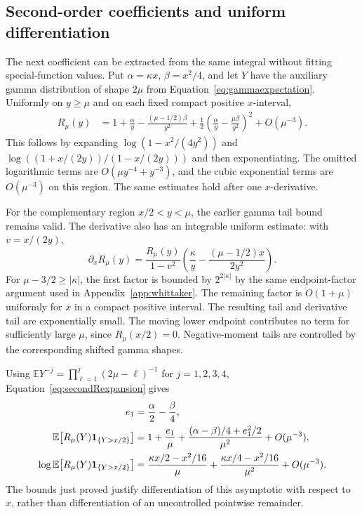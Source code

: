 \documentclass[11pt,letterpaper]{article}
\numberwithin{equation}{section}
\theoremstyle{definition}
\theoremstyle{remark}
\begin{document}
\subsection{Second-order coefficients and uniform differentiation}
\label{subsec:secondorderwhittaker}
The next coefficient can be extracted from the same integral without fitting special-function values. Put $\alpha=\kappa x$, $\beta=x^2/4$, and let $Y$ have the auxiliary gamma distribution of shape $2\mu$ from Equation~\eqref{eq:gammaexpectation}. Uniformly on $y\geq\mu$ and on each fixed compact positive $x$-interval,
\begin{align}
 R_\mu(y)
 &=1+\frac\alpha y-\frac{(\mu-1/2)\beta}{y^2}
   +\frac12\left(\frac\alpha y-\frac{\mu\beta}{y^2}\right)^2
   +O(\mu^{-3}).
 \label{eq:secondRexpansion}
\end{align}
This follows by expanding $\log(1-x^2/(4y^2))$ and
$\log((1+x/(2y))/(1-x/(2y)))$ and then exponentiating. The omitted logarithmic terms are $O(\mu y^{-4}+y^{-3})$, and the cubic exponential terms are $O(\mu^{-3})$ on this region. The same estimates hold after one $x$-derivative.

For the complementary region $x/2<y<\mu$, the earlier gamma tail bound remains valid. The derivative also has an integrable uniform estimate: with $v=x/(2y)$,
\begin{equation}
 \partial_xR_\mu(y)
 =\frac{R_\mu(y)}{1-v^2}
       \left(\frac\kappa y-\frac{(\mu-1/2)x}{2y^2}\right).
 \label{eq:Rderivativebound}
\end{equation}
For $\mu-3/2\geq|\kappa|$, the first factor is bounded by $2^{2|\kappa|}$ by the same endpoint-factor argument used in Appendix~\ref{app:whittaker}. The remaining factor is $O(1+\mu)$ uniformly for $x$ in a compact positive interval. The resulting tail and derivative tail are exponentially small. The moving lower endpoint contributes no term for sufficiently large $\mu$, since $R_\mu(x/2)=0$. Negative-moment tails are controlled by the corresponding shifted gamma shapes.

Using
$\mathbb E Y^{-j}=\prod_{\ell=1}^{j}(2\mu-\ell)^{-1}$ for $j=1,2,3,4$, Equation~\eqref{eq:secondRexpansion} gives
\begin{align}
 e_1&=\frac\alpha2-\frac\beta4,\notag\\
 \mathbb E\!\left[R_\mu(Y)\mathbf1_{\{Y>x/2\}}\right]
 &=1+\frac{e_1}{\mu}
     +\frac{(\alpha-\beta)/4+e_1^2/2}{\mu^2}
     +O(\mu^{-3}),\notag\\
 \log\mathbb E\!\left[R_\mu(Y)\mathbf1_{\{Y>x/2\}}\right]
 &=\frac{\kappa x/2-x^2/16}{\mu}
     +\frac{\kappa x/4-x^2/16}{\mu^2}
     +O(\mu^{-3}).
 \label{eq:secondgammaexpectation}
\end{align}
The bounds just proved justify differentiation of this asymptotic with respect to $x$, rather than differentiation of an uncontrolled pointwise remainder.
\end{document}
